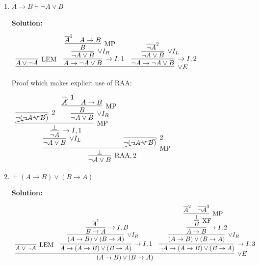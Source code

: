 \documentclass[11pt]{report}
\newcommand{\temp}[2]{{\overline{#2}}^{#1}}
\begin{document}
\begin{enumerate}
\begin{enumerate}
		\item $ A \to  B \vdash  \neg  A \lor  B$  
		
		\textbf{Solution:}

		\begin{center}
			$\begin{array}{c}
				\infer[\lor E]{}
					{\infer[\LEM]{A \lor \lnot A}{}
					&
					\infer[\to I,1]{A \to \lnot A \lor B}
						{\infer[\lor I_{R}]{\lnot A \lor B}
							{\infer[\MP]{B}
								{\temp{1}{A} & A \to B}}}
					&
					\infer[\to I,2]{\lnot A \to \lnot A \lor B}
						{\infer[\lor I_{L}]{\lnot A \lor B}
							{\temp{2}{\lnot A}}}}
			\end{array}$
		\end{center}

		Proof which makes explicit use of RAA: 

		\begin{center}
			$\begin{array}{c}
				\infer[\RAA,2]{\lnot A \lor B}
					{\infer[\MP]{\bot}
						{\infer[\lor I_{L}]{\lnot A \lor B}
							{\infer[\to I,1]{\lnot A}
								{\infer[\MP]{\bot}
									{\infer[2]{\cancel{\lnot(\lnot A \lor B)}}{}
									&
									\infer[\lor I_{R}]{\lnot A \lor B}
										{\infer[\MP]{B}
											{\infer[1]{\cancel{A}}{}
											&
											A \to B}}}}}
						&
						\infer[2]{\cancel{\lnot(\lnot A \lor B)}}{}}}
			\end{array}$
		\end{center}		
		
		\newpage
		\item $\vdash (A \to B) \lor (B \to A)$
		
		\textbf{Solution:}

		\begin{center}
			$\begin{array}{c}
				\infer[\lor E]{(A \to B) \lor (B \to A)}
					{\infer[\LEM]{A \lor \lnot A}{}
					&
					\infer[\to I,1]{A \to (A \to B) \lor (B \to A)}
						{\infer[\lor I_{R}]{(A \to B) \lor (B \to A)}
							{\infer[\to I, B]{B \to A}
								{\temp{1}{A}}}}
					&
					\infer[\to I,3]{\lnot A \to (A \to B) \lor (B \to A)}
						{\infer[\lor I_{R}]{(A \to B) \lor (B \to A)}
							{\infer[\to I,2]{A \to B}
								{\infer[\XF]{B}
									{\infer[\MP]{\bot}
										{\temp{2}{A}&\temp{3}{\lnot A}}}}}}}
			\end{array}$
		\end{center}


\end{enumerate}
\end{enumerate}
\end{document}
